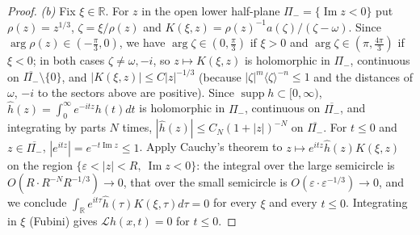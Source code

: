 \documentclass[10pt,reqno]{amsart}
\theoremstyle{remark}
\numberwithin{equation}{section}
\newcommand{\R}{\mathbb R}
\newcommand{\om}{\omega}
\newcommand{\ima}{\operatorname{Im}}
\newcommand{\supp}{\operatorname{supp}}
\newcommand{\ve}{\varepsilon}
\newcommand{\lan}{\langle}
\newcommand{\ran}{\rangle}
\newcommand{\Lc}{\mathcal{L}}
\begin{document}
\begin{proof}
\emph{(b)} Fix $\xi\in\R$. For $z$ in the open lower half-plane $\Pi_-=\{\ima z<0\}$ put $\rho(z)=z^{1/3}$, $\zeta=\xi/\rho(z)$ and $K(\xi,z)=\rho(z)^{-1}a(\zeta)/(\zeta-\om)$. Since $\arg\rho(z)\in(-\frac\pi3,0)$, we have $\arg\zeta\in(0,\frac\pi3)$ if $\xi>0$ and $\arg\zeta\in(\pi,\frac{4\pi}3)$ if $\xi<0$; in both cases $\zeta\ne\om,-i$, so $z\mapsto K(\xi,z)$ is holomorphic in $\Pi_-$, continuous on $\overline{\Pi_-}\setminus\{0\}$, and $|K(\xi,z)|\le C|z|^{-1/3}$ (because $|\zeta|^m\lan\zeta\ran^{-n}\le1$ and the distances of $\om$, $-i$ to the sectors above are positive). Since $\supp h\subset[0,\infty)$, $\widehat h(z)=\int_0^\infty e^{-itz}h(t)dt$ is holomorphic in $\Pi_-$, continuous on $\overline{\Pi_-}$, and integrating by parts $N$ times, $|\widehat h(z)|\le C_N(1+|z|)^{-N}$ on $\overline{\Pi_-}$. For $t\le0$ and $z\in\overline{\Pi_-}$, $|e^{itz}|=e^{-t\ima z}\le1$. Apply Cauchy's theorem to $z\mapsto e^{itz}\widehat h(z)K(\xi,z)$ on the region $\{\ve<|z|<R,\ \ima z<0\}$: the integral over the large semicircle is $O(R\cdot R^{-N}R^{-1/3})\to0$, that over the small semicircle is $O(\ve\cdot\ve^{-1/3})\to0$, and we conclude $\int_\R e^{it\tau}\widehat h(\tau)K(\xi,\tau)d\tau=0$ for every $\xi$ and every $t\le0$. Integrating in $\xi$ (Fubini) gives $\Lc h(x,t)=0$ for $t\le0$.


\end{proof}
\end{document}

